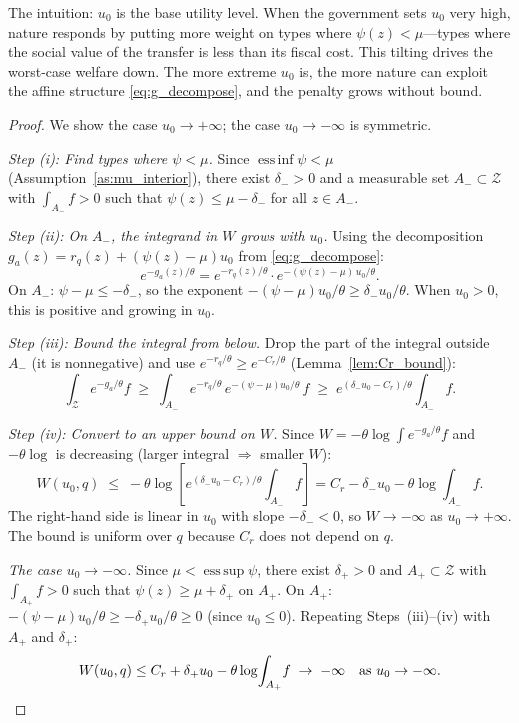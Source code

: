 \documentclass[12pt,a4paper]{article}
\theoremstyle{definition}
\theoremstyle{plain}
\theoremstyle{remark}
\newcommand{\calZ}{\mathcal{Z}}
\begin{document}
The intuition: $u_0$ is the base utility level.  When the
government sets $u_0$ very high, nature responds by putting
more weight on types where $\psi(z) < \mu$---types where
the social value of the transfer is less than its fiscal
cost.  This tilting drives the worst-case welfare down.
The more extreme $u_0$ is, the more nature can exploit the
affine structure \eqref{eq:g_decompose}, and the penalty
grows without bound.

\begin{proof}
We show the case $u_0 \to +\infty$; the case
$u_0 \to -\infty$ is symmetric.

\emph{Step (i): Find types where $\psi < \mu$.}
Since $\operatorname*{ess\,inf}\psi < \mu$
(Assumption~\ref{as:mu_interior}), there exist
$\delta_- > 0$ and a measurable set $A_- \subset \calZ$
with $\int_{A_-} f > 0$ such that
$\psi(z) \leq \mu - \delta_-$ for all $z \in A_-$.

\emph{Step (ii): On $A_-$, the integrand in $W$ grows
with $u_0$.}
Using the decomposition $g_a(z) = r_q(z) +
(\psi(z) - \mu)u_0$ from \eqref{eq:g_decompose}:
\[
  e^{-g_a(z)/\theta}
  = e^{-r_q(z)/\theta} \cdot
  e^{-(\psi(z)-\mu)\,u_0/\theta}.
\]
On $A_-$: $\psi - \mu \leq -\delta_-$, so the exponent
$-(\psi - \mu)u_0/\theta \geq \delta_- u_0/\theta$.
When $u_0 > 0$, this is positive and growing in $u_0$.

\emph{Step (iii): Bound the integral from below.}
Drop the part of the integral outside $A_-$ (it is
nonnegative) and use $e^{-r_q/\theta} \geq
e^{-C_r/\theta}$ (Lemma~\ref{lem:Cr_bound}):
\[
  \int_\calZ e^{-g_a/\theta}f
  \;\geq\; \int_{A_-} e^{-r_q/\theta}\,
  e^{-(\psi-\mu)u_0/\theta}\,f
  \;\geq\; e^{(\delta_- u_0 - C_r)/\theta}
  \int_{A_-}\!f.
\]

\emph{Step (iv): Convert to an upper bound on $W$.}
Since $W = -\theta\log\!\int e^{-g_a/\theta}f$ and
$-\theta\log$ is decreasing (larger integral $\Rightarrow$
smaller $W$):
\[
  W(u_0, q)
  \;\leq\; -\theta\log\!\left[
    e^{(\delta_- u_0 - C_r)/\theta}\int_{A_-}\!f
  \right]
  = C_r - \delta_- u_0
  - \theta\log\!\int_{A_-}\!f.
\]
The right-hand side is linear in $u_0$ with slope
$-\delta_- < 0$, so $W \to -\infty$ as
$u_0 \to +\infty$.  The bound is uniform over $q$
because $C_r$ does not depend on $q$.

\emph{The case $u_0 \to -\infty$.}
Since $\mu < \operatorname*{ess\,sup}\psi$, there exist
$\delta_+ > 0$ and $A_+ \subset \calZ$ with
$\int_{A_+} f > 0$ such that
$\psi(z) \geq \mu + \delta_+$ on $A_+$.
On $A_+$: $-(\psi - \mu)u_0/\theta \geq
-\delta_+ u_0/\theta \geq 0$ (since $u_0 \leq 0$).
Repeating Steps~(iii)--(iv) with $A_+$ and $\delta_+$:
\[
  W(u_0, q)
  \leq C_r + \delta_+ u_0
  - \theta\log\!\int_{A_+}\!f
  \;\to\; -\infty
  \quad \text{as } u_0 \to -\infty.\qedhere
\]
\end{proof}
\end{document}
